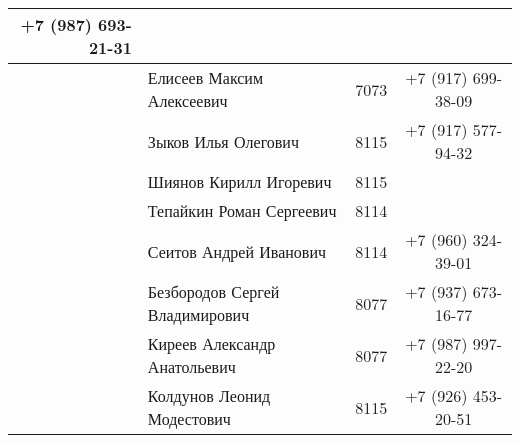 \documentclass[a4paper,12pt]{article} %
\newcounter{magicrownumbers}
\newcommand\rownumber{\stepcounter{magicrownumbers}\arabic{magicrownumbers}}
\begin{document}
\begin{longtable}{r|l|c|c}
		+7 (987) 693-21-31\\
		\midrule
		\rownumber & Елисеев Максим Алексеевич & 7073 &
		+7 (917) 699-38-09\\
		\midrule
		\rownumber & Зыков Илья Олегович & 8115 &
		+7 (917) 577-94-32\\
		\midrule
		\rownumber & Шиянов Кирилл Игоревич & 8115 &\\
		\midrule
		\rownumber & Тепайкин Роман Сергеевич & 8114 & 	\\
		\midrule
		\rownumber & Сеитов Андрей Иванович & 8114 &
		+7 (960) 324-39-01\\
		\midrule
		\rownumber & Безбородов Сергей Владимирович & 8077 &
		+7 (937) 673-16-77\\
		\midrule
		\rownumber & Киреев Александр Анатольевич & 8077 &
		+7 (987) 997-22-20\\
		\midrule
		\rownumber & Колдунов Леонид Модестович & 8115 &
		+7 (926) 453-20-51\\
		\bottomrule
	\end{longtable}
\end{document}
